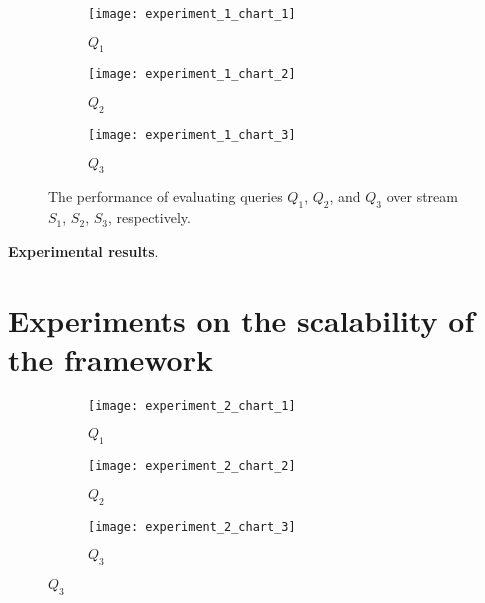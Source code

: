 \begin{figure}[H]
     \begin{adjustbox}{max width=1.5\linewidth,center}
     \centering
     \begin{subfigure}[b]{0.45\textwidth}
         \centering
         \texttt{[image: experiment\_1\_chart\_1]}
         \caption{$Q_{1}$}
         \label{fig:experiment:1:subfigure:1}
     \end{subfigure}
     \hfill
     \begin{subfigure}[b]{0.45\textwidth}
         \centering
         \texttt{[image: experiment\_1\_chart\_2]}
         \caption{$Q_{2}$}
         \label{fig:experiment:1:subfigure:2}
     \end{subfigure}
     \hfill
     \begin{subfigure}[b]{0.45\textwidth}
         \centering
         \texttt{[image: experiment\_1\_chart\_3]}
         \caption{$Q_{3}$}
         \label{fig:experiment:1:subfigure:3}
     \end{subfigure}
     \end{adjustbox}
     \caption{The performance of evaluating queries $Q_{1}$, $Q_{2}$, and $Q_{3}$ over stream $S_{1}$, $S_{2}$, $S_{3}$, respectively.}
     \label{fig:experiment:1}
\end{figure}

\textbf{Experimental results}.

\section{Experiments on the scalability of the framework}\label{sec:scalability}


\begin{figure}[H]
     \begin{adjustbox}{max width=1.5\linewidth,center}
     \centering
     \begin{subfigure}[b]{0.45\textwidth}
         \centering
         \texttt{[image: experiment\_2\_chart\_1]}
         \caption{$Q_{1}$}
         \label{fig:experiment:1:subfigure:1}
     \end{subfigure}
     \begin{subfigure}[b]{0.45\textwidth}
         \centering
         \texttt{[image: experiment\_2\_chart\_2]}
         \caption{$Q_{2}$}
         \label{fig:experiment:1:subfigure:2}
     \end{subfigure}
     \begin{subfigure}[b]{0.45\textwidth}
         \centering
         \texttt{[image: experiment\_2\_chart\_3]}
         \caption{$Q_{3}$}
         \label{fig:experiment:1:subfigure:3}
     \end{subfigure}
     \end{adjustbox}
\end{figure}

